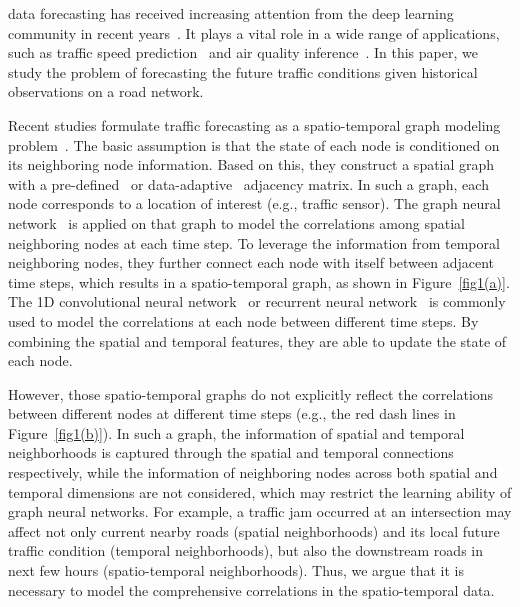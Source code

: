 \documentclass[10pt,journal,compsoc]{IEEEtran}
\begin{document}
 data forecasting has received increasing attention from the deep learning community in recent years~\cite{Wang-et-al:TKDE2020,Tedjopurnomo-et-al:TKDE2020,Zheng-et-al:TITS2021}. It plays a vital role in a wide range of applications, such as traffic speed prediction~\cite{Li-et-al:ICLR2018} and air quality inference~\cite{Cheng-et-al:AAAI2018}. In this paper, we study the problem of forecasting the future traffic conditions given historical observations on a road network.

Recent studies formulate traffic forecasting as a spatio-temporal graph modeling problem~\cite{Li-et-al:ICLR2018,Yu-et-al:IJCAI2018,Wu-et-al:IJCAI2019,Guo-et-al:AAAI2019,Song-et-al:AAAI2020,Bai-et-al:NIPS2020, Chen-et-al:ICML2021}. The basic assumption is that the state of each node is conditioned on its neighboring node information. Based on this, they construct a spatial graph with a pre-defined~\cite{Li-et-al:ICLR2018} or data-adaptive~\cite{Wu-et-al:IJCAI2019} adjacency matrix. In such a graph, each node corresponds to a location of interest (e.g., traffic sensor). The graph neural network~\cite{Wu-et-al:TNNLS2021} is applied on that graph to model the correlations among spatial neighboring nodes at each time step. To leverage the information from temporal neighboring nodes, they further connect each node with itself between adjacent time steps, which results in a spatio-temporal graph, as shown in Figure~\ref{fig1(a)}. The 1D convolutional neural network~\cite{Yu-et-al:IJCAI2018} or recurrent neural network~\cite{Li-et-al:ICLR2018} is commonly used to model the correlations at each node between different time steps. By combining the spatial and temporal features, they are able to update the state of each node. 

However, those spatio-temporal graphs do not explicitly reflect the correlations between different nodes at different time steps (e.g., the red dash lines in Figure~\ref{fig1(b)}). In such a graph, the information of spatial and temporal neighborhoods is captured through the spatial and temporal connections respectively, while the information of neighboring nodes across both spatial and temporal dimensions are not considered, which may restrict the learning ability of graph neural networks. For example, a traffic jam occurred at an intersection may affect not only current nearby roads (spatial neighborhoods) and its local future traffic condition (temporal neighborhoods), but also the downstream roads in next few hours (spatio-temporal neighborhoods). Thus, we argue that it is necessary to model the comprehensive correlations in the spatio-temporal data.
\end{document}
